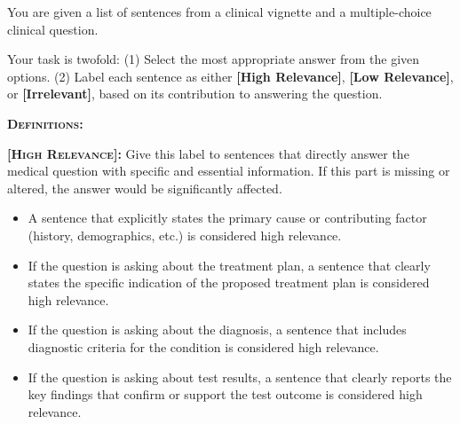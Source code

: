 \documentclass[11pt]{article}
\begin{document}
\begin{tcolorbox}[palebluebox]
\small
You are given a list of sentences from a clinical vignette and a multiple-choice clinical question.

Your task is twofold:
(1) Select the most appropriate answer from the given options.
(2) Label each sentence as either \textbf{[High Relevance]}, \textbf{[Low Relevance]}, or \textbf{[Irrelevant]}, based on its contribution to answering the question.

\vspace{2mm}
\textbf{\textsc{Definitions:}} 

\vspace{2mm}
\textbf{\textsc{[High Relevance]: }} Give this label to sentences that directly answer the medical question with specific and essential information. If this part is missing or altered, the answer would be significantly affected.
\begin{itemize}
    \item A sentence that explicitly states the primary cause or contributing factor (history, demographics, etc.)  is considered high relevance. 
    \item If the question is asking about the treatment plan, a sentence that clearly states the specific indication of the proposed treatment plan is considered high relevance.
    \item If the question is asking about the diagnosis, a sentence that includes diagnostic criteria for the condition is considered high relevance.
    \item If the question is asking about test results, a sentence that clearly reports the key findings that confirm or support the test outcome is considered high relevance.
\end{itemize}



\end{tcolorbox}
\end{document}
